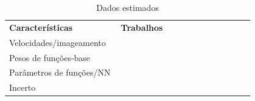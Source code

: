 \begin{table}[H]
	\def\seleccite{\bfseries}
	\centering
	\caption{Dados estimados}
	\begin{tabular}{C{0.3\linewidth} C{0.5\linewidth}}
		\textbf{Características} & \textbf{Trabalhos} \\
		\ttline
		Velocidades/imageamento & 
		\cite{bao_online_2020}
		\cite{djikpesse_reducing_2010}
		\cite{goyal_ultrasound_2025}
		\cite{gras_practical_2022}
		\cite{li_multiscale_2024}
		\cite{othmani_acoustic_2024}
		\cite{shin_distributed_2022}
		\cite{wo_firstarrival_2024}
		\cite{zhang_optimization_2023}
		\cite{zhang_nonlinear_2022}
		\cite{bender_threedimensional_2012}
		\cite{chapeland_highresolution_2022}
		\cite{datta_fast_2019}
		\cite{deluca_simultaneous_2022}
		\cite{mallick_prediction_2022}
		\cite{ritter_water_2010}
		\cite{takeuchi_development_1993}
		\cite{taroudakis_tomographic_2001}
		\cite{vadapalli_application_2012}
		\cite{voort_inversion_2022}
		\cite{wellington_2d_2015}
		\cite{wong_leastsquares_2011}
		\\\tline
		Pesos de funções-base & 
		\cite{carriere_featureoriented_2013}
		\cite{han_realtime_2014}
		\cite{yu_krylov_2021}
		\cite{becker_geoacoustic_2007}
		\cite{lin_equivalent_2006}
		\cite{radhakrishnan_inversion_2024}
		\cite{zhang_inversion_2016}
		\\\tline
		Parâmetros de funções/NN &
		\cite{agata_bayesian_2023}
		\cite{jo_seismic_2023}
		\cite{jo_seismic_2024}
		\cite{mei_uncertainty_2025}
		\cite{wang_seismic_2024}
		\cite{mitchell_optical_2018}
		\cite{wu_inversion_2023}
		\\\tline
		Incerto &
		\cite{abakumov_timelapse_2019}
		\cite{amini_joint_2016}
		\cite{ashley_inverted_1998}
		\cite{dosso_joint_2023}
		\cite{hou_velocity_2018}
		\cite{mcmechan_application_1982}
		\cite{michalopoulou_environmental_2018}
	\end{tabular}
\end{table}

